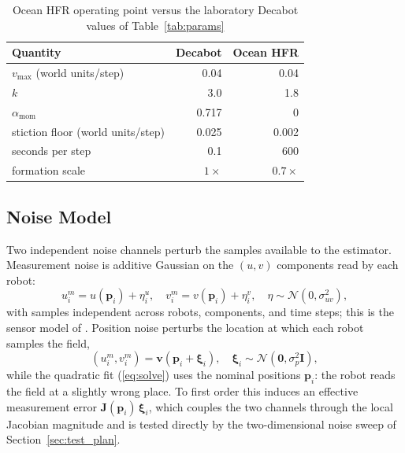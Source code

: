 \documentclass[lettersize,journal]{IEEEtran}
\begin{document}
\begin{table}[!t]
\centering
\caption{Ocean HFR operating point versus the laboratory Decabot values of Table~\ref{tab:params}}
\label{tab:ocean_params}
\footnotesize
\setlength{\tabcolsep}{4pt}
\begin{tabular}{lrr}
\hline
\textbf{Quantity} & \textbf{Decabot} & \textbf{Ocean HFR} \\
\hline
$v_{\max}$ (world units/step) & 0.04 & 0.04 \\
$k$ & 3.0 & 1.8 \\
$\alpha_{\text{mom}}$ & 0.717 & 0 \\
stiction floor (world units/step) & 0.025 & 0.002 \\
seconds per step & 0.1 & 600 \\
formation scale & $1\times$ & $0.7\times$ \\
\hline
\end{tabular}
\end{table}

\subsection{Noise Model}
\label{sec:noise_model}

Two independent noise channels perturb the samples available to the
estimator. Measurement noise is additive Gaussian on the $(u, v)$
components read by each robot:
\begin{equation}
    u_i^m = u(\mathbf{p}_i) + \eta_i^u, \quad
    v_i^m = v(\mathbf{p}_i) + \eta_i^v,
    \quad \eta \sim \mathcal{N}(0, \sigma_{uv}^2),
    \label{eq:meas_noise}
\end{equation}
with samples independent across robots, components, and time steps; this
is the sensor model of \cite{9}. Position noise perturbs the location at
which each robot samples the field,
\begin{equation}
    (u_i^m, v_i^m) = \mathbf{v}(\mathbf{p}_i + \boldsymbol{\xi}_i), \quad
    \boldsymbol{\xi}_i \sim \mathcal{N}(\mathbf{0}, \sigma_p^2 \mathbf{I}),
    \label{eq:pos_noise}
\end{equation}
while the quadratic fit (\ref{eq:solve}) uses the nominal positions
$\mathbf{p}_i$: the robot reads the field at a slightly wrong place. To
first order this induces an effective measurement error
$\mathbf{J}(\mathbf{p}_i)\,\boldsymbol{\xi}_i$, which couples the two
channels through the local Jacobian magnitude and is tested directly by
the two-dimensional noise sweep of Section~\ref{sec:test_plan}.
\end{document}
